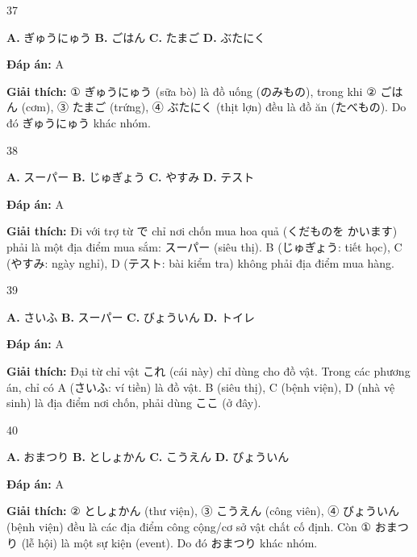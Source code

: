 \documentclass[12pt,a4paper]{report}
\newcommand{\source}[1]{}
\newcommand{\choice}[2]{\textbf{#1.} #2 \quad}
\newcommand{\answer}[1]{\par\textbf{Đáp án:} #1}
\newcommand{\confidence}[1]{}
\newcommand{\explain}[1]{\par\textbf{Giải thích:} #1\vspace{0.5cm}}
\begin{document}
\begin{question}{37}
\source{Q25.jpg}
\choice{A}{ぎゅうにゅう}
\choice{B}{ごはん}
\choice{C}{たまご}
\choice{D}{ぶたにく}
\answer{A}
\confidence{high}
\explain{① ぎゅうにゅう (sữa bò) là đồ uống (のみもの), trong khi ② ごはん (cơm), ③ たまご (trứng), ④ ぶたにく (thịt lợn) đều là đồ ăn (たべもの). Do đó ぎゅうにゅう khác nhóm.}
\end{question}

\begin{question}{38}
\source{Q26.jpg}
\choice{A}{スーパー}
\choice{B}{じゅぎょう}
\choice{C}{やすみ}
\choice{D}{テスト}
\answer{A}
\confidence{high}
\explain{Đi với trợ từ で chỉ nơi chốn mua hoa quả (くだものを かいます) phải là một địa điểm mua sắm: スーパー (siêu thị). B (じゅぎょう: tiết học), C (やすみ: ngày nghỉ), D (テスト: bài kiểm tra) không phải địa điểm mua hàng.}
\end{question}

\begin{question}{39}
\source{Q27.jpg}
\choice{A}{さいふ}
\choice{B}{スーパー}
\choice{C}{びょういん}
\choice{D}{トイレ}
\answer{A}
\confidence{high}
\explain{Đại từ chỉ vật これ (cái này) chỉ dùng cho đồ vật. Trong các phương án, chỉ có A (さいふ: ví tiền) là đồ vật. B (siêu thị), C (bệnh viện), D (nhà vệ sinh) là địa điểm nơi chốn, phải dùng ここ (ở đây).}
\end{question}

\begin{question}{40}
\source{Q28.jpg}
\choice{A}{おまつり}
\choice{B}{としょかん}
\choice{C}{こうえん}
\choice{D}{びょういん}
\answer{A}
\confidence{high}
\explain{② としょかん (thư viện), ③ こうえん (công viên), ④ びょういん (bệnh viện) đều là các địa điểm công cộng/cơ sở vật chất cố định. Còn ① おまつり (lễ hội) là một sự kiện (event). Do đó おまつり khác nhóm.}
\end{question}
\end{document}

